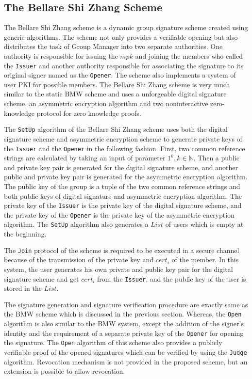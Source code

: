 \subsection{The Bellare Shi Zhang Scheme}
The Bellare Shi Zhang scheme is a dynamic group signature scheme created using generic algorithms\cite{bellare2005foundations}. The scheme not only provides a verifiable opening but also distributes the task of Group Manager into two separate authorities. One authority is responsible for issuing the $mpk$ and joining the members who called the \texttt{Issuer} and another authority responsible for associating the signature to its original signer named as the \texttt{Opener}. The scheme also implements a system of user PKI for possible members. The Bellare Shi Zhang scheme is very much similar to the static BMW scheme and uses a unforgeable digital signature scheme, an asymmetric encryption algorithm and two noninteractive zero-knowledge protocol for zero knowledge proofs. 

The \texttt{SetUp} algorithm of the Bellare Shi Zhang scheme uses both the digital signature scheme and asymmetric encryption scheme to generate private keys of the \texttt{Issuer} and the \texttt{Opener} in the following fashion. First, two common reference strings are calculated by taking an input of parameter $1^k, k \in \mathbb{N}$. Then a public and private key pair is generated for the digital signature scheme, and another public and private key pair is generated for the asymmetric encryption algorithm. The public key of the group is a tuple of the two common reference strings and both public keys of digital signature and asymmetric encryption algorithm. The private key of the \texttt{Issuer} is the private key of the digital signature scheme, and the private key of the \texttt{Opener} is the private key of the asymmetric encryption algorithm. The \texttt{SetUp} algorithm also generates a $List$ of users which is empty at the beginning. 

The \texttt{Join} protocol of the scheme is required to be executed in a secure channel because of the transmission of the private key and $cert_i$ of the member. In this system, the user generates his own private and public key pair for the digital signature scheme and get $cert_i$ from the \texttt{Issuer}, and the public key of the user is stored in the $List$.

The signature generation and signature verification procedure are exactly same as the BMW scheme which is discussed in the previous section. Whereas, the \texttt{Open} algorithm is also similar to the BMW system, except the addition of the signer's identity and the requirement of a separate private key of the \texttt{Opener} for opening the signature. The \texttt{Open} algorithm of this scheme also provides a publicly verifiable proof of the opened signatures which can be verified by using the \texttt{Judge} algorithm. Revocation mechanism is not provided in the proposed scheme, but an extension is possible
to allow revocation.

